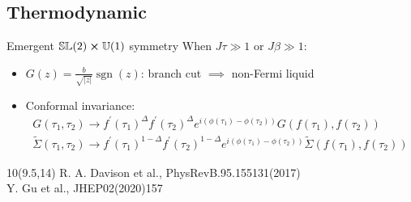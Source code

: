\subsection{Thermodynamic}
\begin{frame}{Emergent $\mathbb{SL}(2) \cross \mathbb{U}(1)$ symmetry}
\qquad When $J\tau \gg 1$ or $J\beta \gg 1$:
\begin{itemize}
\item $G(z)=\frac{b}{\sqrt{|z|}}\operatorname{sgn}(z)$: branch cut $\implies$ non-Fermi liquid

\vspace{1cm}

\item Conformal invariance:
\begin{equation*}
\begin{array}{l}
G\left(\tau_{1}, \tau_{2}\right) \rightarrow f^{\prime}\left(\tau_{1}\right)^{\Delta} f^{\prime}\left(\tau_{2}\right)^{\Delta} e^{i\left(\phi\left(\tau_{1}\right)-\phi\left(\tau_{2}\right)\right)} G\left(f\left(\tau_{1}\right), f\left(\tau_{2}\right)\right) \\
\widetilde{\Sigma}\left(\tau_{1}, \tau_{2}\right) \rightarrow f^{\prime}\left(\tau_{1}\right)^{1-\Delta} f^{\prime}\left(\tau_{2}\right)^{1-\Delta} e^{i\left(\phi\left(\tau_{1}\right)-\phi\left(\tau_{2}\right)\right)} \widetilde{\Sigma}\left(f\left(\tau_{1}\right), f\left(\tau_{2}\right)\right)
\end{array}
\end{equation*}

\end{itemize}

\begin{textblock}{10}(9.5,14)
\scriptsize
R. A. Davison et al., PhysRevB.95.155131(2017)\\
Y. Gu et al., JHEP02(2020)157
\end{textblock}
\end{frame}
